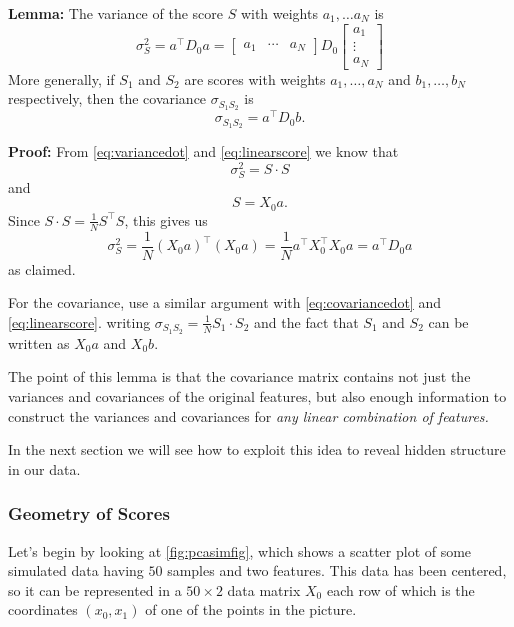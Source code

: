 \documentclass[]{article}
\begin{document}
\textbf{Lemma:} The variance of the score \(S\) with weights
\(a_1,\ldots a_N\) is \begin{equation}
\sigma_{S}^2 = a^{\intercal}D_{0}a = \left[\begin{matrix}a_{1} & \cdots & a_{N}\end{matrix}\right]D_{0}
\left[\begin{matrix} a_{1} \\ \vdots \\ a_{N}\end{matrix}\right]
\label{eq:ada}\end{equation} More generally, if \(S_{1}\) and \(S_{2}\)
are scores with weights \(a_1,\ldots, a_N\) and \(b_1,\ldots, b_N\)
respectively, then the covariance \(\sigma_{S_{1}S_{2}}\) is \[
\sigma_{S_{1}S_{2}} = a^{\intercal}D_{0}b.
\]

\textbf{Proof:} From \cref{eq:variancedot} and \ref{eq:linearscore} we
know that \[
\sigma_{S}^2 = S\cdot S
\] and \[
S = X_{0}a.
\] Since \(S\cdot S = \frac{1}{N}S^{\intercal}S\), this gives us \[
\sigma_{S}^2 = \frac{1}{N}(X_{0}a)^{\intercal}(X_{0}a) = \frac{1}{N}a^{\intercal}X_{0}^{\intercal}X_{0}a = a^{\intercal}D_{0}a
\] as claimed.

For the covariance, use a similar argument with \cref{eq:covariancedot}
and \cref{eq:linearscore}. writing
\(\sigma_{S_{1}S_{2}}=\frac{1}{N}S_{1}\cdot S_{2}\) and the fact that
\(S_{1}\) and \(S_{2}\) can be written as \(X_{0}a\) and \(X_{0}b\).

The point of this lemma is that the covariance matrix contains not just
the variances and covariances of the original features, but also enough
information to construct the variances and covariances for \emph{any
linear combination of features.}

In the next section we will see how to exploit this idea to reveal
hidden structure in our data.

\hypertarget{geometry-of-scores}{%
\subsubsection{Geometry of Scores}\label{geometry-of-scores}}

Let's begin by looking at \cref{fig:pcasimfig}, which shows a scatter
plot of some simulated data having \(50\) samples and two features. This
data has been centered, so it can be represented in a \(50\times 2\)
data matrix \(X_{0}\) each row of which is the coordinates \((x_0,x_1)\)
of one of the points in the picture.
\end{document}
